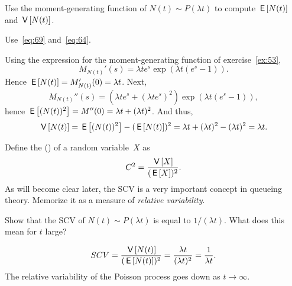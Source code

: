 \begin{exercise}
Use  the moment-generating function of $N(t)\sim P(\lambda t)$ to compute $\,\mathsf{E}\left[N(t)\right]$ and $\,\mathsf{V}\left[N(t)\right]$. 
\begin{hint}
Use~\eqref{eq:69} and~\eqref{eq:64}. 
\end{hint}
\begin{solution}
Using the expression for the moment-generating function of exercise~\ref{ex:53},
  \begin{equation*}
    M_{N(t)}'(s) = \lambda t e^s \exp(\lambda t(e^s - 1)).
  \end{equation*}
Hence $\,\mathsf{E}\left[N(t)\right] = M_{N(t)}'(0) = \lambda t $. Next, 
  \begin{equation*}
    M_{N(t)}''(s) = (\lambda t e^s + (\lambda t e^s)^2) \exp(\lambda t(e^s - 1)),
  \end{equation*}
hence $\,\mathsf{E}\left[(N(t))^2\right] = M''(0) = \lambda t + (\lambda t)^2$. And thus, 
\begin{equation*}
\,\mathsf{V}\left[N(t)\right] =\,\mathsf{E}\left[(N(t))^2\right]-(\,\mathsf{E}\left[N(t)\right])^2 = \lambda t + (\lambda t)^2 - (\lambda t)^2 = \lambda t.
\end{equation*}
\end{solution}
\end{exercise}

Define the  () of a random variable~$X$ as 
\begin{equation}\label{eq:62}
  C^2= \frac{\,\mathsf{V}\left[X\right]}{(\,\mathsf{E}\left[X\right])^2}.
\end{equation}
As  will become clear later, the SCV is a very important concept in
  queueing theory. Memorize it as a measure of \emph{relative
  variability}.

\begin{exercise}
Show that   the SCV of $N(t)\sim P(\lambda t)$ is equal to $1/(\lambda t)$.  What does this mean for $t$ large?
  \begin{solution}
    \begin{equation*}
SCV = \frac{\,\mathsf{V}\left[N(t)\right]}{(\,\mathsf{E}\left[N(t)\right])^2} = \frac{\lambda t}{(\lambda t)^2} = \frac1{\lambda t}.
    \end{equation*}
The relative variability of the Poisson process goes down as $t\to\infty$.  
  \end{solution}
\end{exercise}


